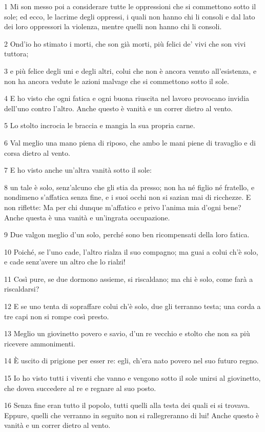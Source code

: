 \par 1 Mi son messo poi a considerare tutte le oppressioni che si commettono sotto il sole; ed ecco, le lacrime degli oppressi, i quali non hanno chi li consoli e dal lato dei loro oppressori la violenza, mentre quelli non hanno chi li consoli.
\par 2 Ond'io ho stimato i morti, che son già morti, più felici de' vivi che son vivi tuttora;
\par 3 e più felice degli uni e degli altri, colui che non è ancora venuto all'esistenza, e non ha ancora vedute le azioni malvage che si commettono sotto il sole.
\par 4 E ho visto che ogni fatica e ogni buona riuscita nel lavoro provocano invidia dell'uno contro l'altro. Anche questo è vanità e un correr dietro al vento.
\par 5 Lo stolto incrocia le braccia e mangia la sua propria carne.
\par 6 Val meglio una mano piena di riposo, che ambo le mani piene di travaglio e di corsa dietro al vento.
\par 7 E ho visto anche un'altra vanità sotto il sole:
\par 8 un tale è solo, senz'alcuno che gli stia da presso; non ha né figlio né fratello, e nondimeno s'affatica senza fine, e i suoi occhi non si sazian mai di ricchezze. E non riflette: Ma per chi dunque m'affatico e privo l'anima mia d'ogni bene? Anche questa è una vanità e un'ingrata occupazione.
\par 9 Due valgon meglio d'un solo, perché sono ben ricompensati della loro fatica.
\par 10 Poiché, se l'uno cade, l'altro rialza il suo compagno; ma guai a colui ch'è solo, e cade senz'avere un altro che lo rialzi!
\par 11 Così pure, se due dormono assieme, si riscaldano; ma chi è solo, come farà a riscaldarsi?
\par 12 E se uno tenta di sopraffare colui ch'è solo, due gli terranno testa; una corda a tre capi non si rompe così presto.
\par 13 Meglio un giovinetto povero e savio, d'un re vecchio e stolto che non sa più ricevere ammonimenti.
\par 14 È uscito di prigione per esser re: egli, ch'era nato povero nel suo futuro regno.
\par 15 Io ho visto tutti i viventi che vanno e vengono sotto il sole unirsi al giovinetto, che dovea succedere al re e regnare al suo posto.
\par 16 Senza fine eran tutto il popolo, tutti quelli alla testa dei quali ei si trovava. Eppure, quelli che verranno in seguito non si rallegreranno di lui! Anche questo è vanità e un correr dietro al vento.

